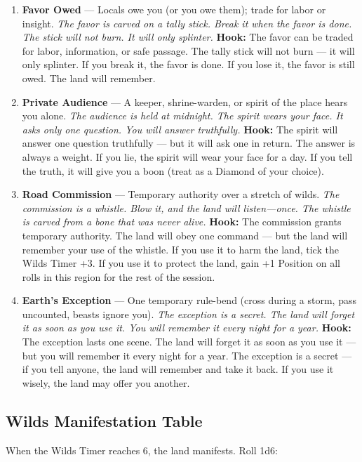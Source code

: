 \begin{enumerate}
\item[J] \textbf{Favor Owed} --- Locals owe you (or you owe them); trade for labor or insight.
  \hfill \textit{The favor is carved on a tally stick. Break it when the favor is done. The stick will not burn. It will only splinter.}
  \textbf{Hook:} The favor can be traded for labor, information, or safe passage. The tally stick will not burn --- it will only splinter. If you break it, the favor is done. If you lose it, the favor is still owed. The land will remember.
  
\item[Q] \textbf{Private Audience} --- A keeper, shrine-warden, or spirit of the place hears you alone.
  \hfill \textit{The audience is held at midnight. The spirit wears your face. It asks only one question. You will answer truthfully.}
  \textbf{Hook:} The spirit will answer one question truthfully --- but it will ask one in return. The answer is always a weight. If you lie, the spirit will wear your face for a day. If you tell the truth, it will give you a boon (treat as a Diamond of your choice).
  
\item[K] \textbf{Road Commission} --- Temporary authority over a stretch of wilds.
  \hfill \textit{The commission is a whistle. Blow it, and the land will listen---once. The whistle is carved from a bone that was never alive.}
  \textbf{Hook:} The commission grants temporary authority. The land will obey one command --- but the land will remember your use of the whistle. If you use it to harm the land, tick the Wilds Timer +3. If you use it to protect the land, gain +1 Position on all rolls in this region for the rest of the session.
  
\item[A] \textbf{Earth's Exception} --- One temporary rule-bend (cross during a storm, pass uncounted, beasts ignore you).
  \hfill \textit{The exception is a secret. The land will forget it as soon as you use it. You will remember it every night for a year.}
  \textbf{Hook:} The exception lasts one scene. The land will forget it as soon as you use it --- but you will remember it every night for a year. The exception is a secret --- if you tell anyone, the land will remember and take it back. If you use it wisely, the land may offer you another.
\end{enumerate}

\subsection*{Wilds Manifestation Table}
\label{sec:wilds-manifestation}
When the Wilds Timer reaches 6, the land manifests. Roll 1d6:

